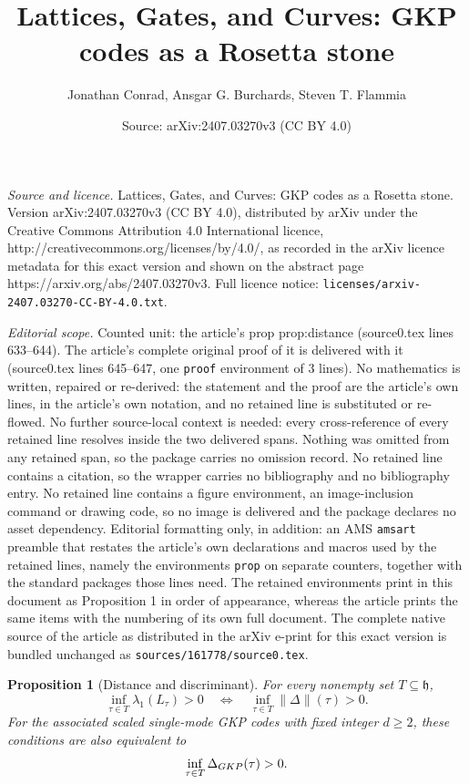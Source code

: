 \documentclass[10pt,a4paper]{amsart}
\title{Lattices, Gates, and Curves: GKP codes as a Rosetta stone}
\author{Jonathan Conrad, Ansgar G. Burchards, Steven T. Flammia}
\date{Source: arXiv:2407.03270v3 (CC BY 4.0)}
\newtheorem{prop}{Proposition}
\newcommand{\hh}{\mathfrak{h}}
\begin{document}
\maketitle

\noindent\emph{Source and licence.} Lattices, Gates, and Curves: GKP codes as a Rosetta stone. Version arXiv:2407.03270v3 (CC BY 4.0), distributed by arXiv under the Creative Commons Attribution 4.0 International licence, http://creativecommons.org/licenses/by/4.0/, as recorded in the arXiv licence metadata for this exact version and shown on the abstract page https://arxiv.org/abs/2407.03270v3. Full licence notice: \texttt{licenses/arxiv-2407.03270-CC-BY-4.0.txt}.\par\smallskip

\noindent\textit{Editorial scope.} Counted unit: the article's prop prop:distance (source0.tex lines 633--644). The article's complete original proof of it is delivered with it (source0.tex lines 645--647, one \texttt{proof} environment of 3 lines). No mathematics is written, repaired or re-derived: the statement and the proof are the article's own lines, in the article's own notation, and no retained line is substituted or re-flowed.  No further source-local context is needed: every cross-reference of every retained line resolves inside the two delivered spans.  Nothing was omitted from any retained span, so the package carries no omission record.  No retained line contains a citation, so the wrapper carries no bibliography and no bibliography entry.  No retained line contains a figure environment, an image-inclusion command or drawing code, so no image is delivered and the package declares no asset dependency.  Editorial formatting only, in addition: an AMS \texttt{amsart} preamble that restates the article's own declarations and macros used by the retained lines, namely the environments \texttt{prop} on separate counters, together with the standard packages those lines need.  The retained environments print in this document as Proposition 1 in order of appearance, whereas the article prints the same items with the numbering of its own full document.  The complete native source of the article as distributed in the arXiv e-print for this exact version is bundled unchanged as \texttt{sources/161778/source0.tex}.
\begin{prop}[Distance and discriminant]\label{prop:distance}
For every nonempty set $T\subseteq\hh$,
\begin{equation}
\inf_{\tau\in T}\lambda_1(L_\tau)>0
\quad\Longleftrightarrow\quad
\inf_{\tau\in T}\|\Delta\|(\tau)>0.
\end{equation}
For the associated scaled single-mode GKP codes with fixed integer $d\geq2$, these conditions are also equivalent to
\begin{equation}
\inf_{\tau\in T}\Delta_{\rm GKP}(\tau)>0.
\end{equation}
\end{prop}
\end{document}

